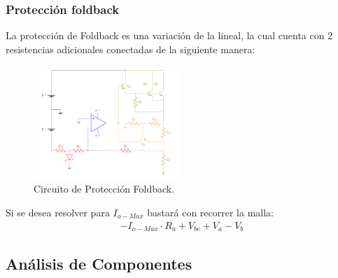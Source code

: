 \subsubsection{Protección foldback}
La protección de Foldback es una variación de la lineal, la cual cuenta con 2 resistencias adicionales conectadas de la siguiente manera:
\begin{figure}[H]
\centering
	\includegraphics[width=0.5\textwidth, page=2]{ImagenesEjercicio2/Regulador.pdf}
	\caption{Circuito de Protección Foldback.}
	\label{fig:circuitofoldback}
\end{figure}
Si se desea resolver para $I_{o-Max}$ bastará con recorrer la malla:
\begin{align}
-I_{o-Max} \cdot R_a + V_{be} + V_a-V_b
\end{align}
\subsection{Análisis de Componentes}
